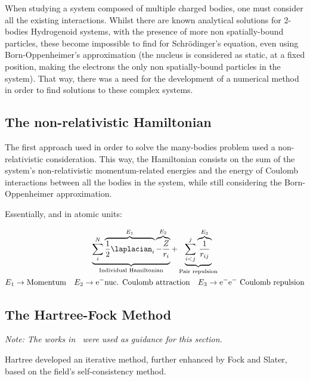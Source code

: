 When studying a system composed of multiple charged bodies, one must consider all the existing interactions. Whilst there are known analytical solutions for 2-bodies Hydrogenoid systems, with the presence of more non spatially-bound particles, these become impossible to find for Schrödinger's equation, even using Born-Oppenheimer's approximation (the nucleus is considered as static, at a fixed position, making the electrons the only non spatially-bound particles in the system). That way, there was a need for the development of a numerical method in order to find solutions to these complex systems.

\subsection{The non-relativistic Hamiltonian}

The first approach used in order to solve the many-bodies problem used a non-relativistic consideration. This way, the Hamiltonian consists on the sum of the system's non-relativistic momentum-related energies and the energy of Coulomb interactions between all the bodies in the system, while still considering the Born-Oppenheimer approximation.

Essentially, and in atomic units:




\begin{equation}
    \begin{gathered}
        \underbrace{\sum_i^N \overbrace{ \dfrac{1}{2}\laplacian_i}^{E_1}  \overbrace{-\frac{Z}{r_i}}^{E_2}}_{\text{Individual Hamiltonian}}  + \underbrace{\sum_{i<j}^{j}\overbrace{\dfrac{1}{r_{ij}}}^{E_3}}_{\text{Pair repulsion}}\\
        E_1\rightarrow\text{Momentum}\quad E_2\rightarrow\text{e$^-$nuc. Coulomb attraction}\quad E_3\rightarrow\text{e$^-$e$^-$ Coulomb repulsion}
    \end{gathered}
    \label{eq:nonRelHam}
\end{equation}



\subsection{The Hartree-Fock Method}\label{sec:HF}
\textit{Note: The works in~\cite{HFweb,JPS,Ramon,Blinder2018} were used as guidance for this section.}

Hartree developed an iterative method, further enhanced by Fock and Slater, based on the field's self-consistency method.

